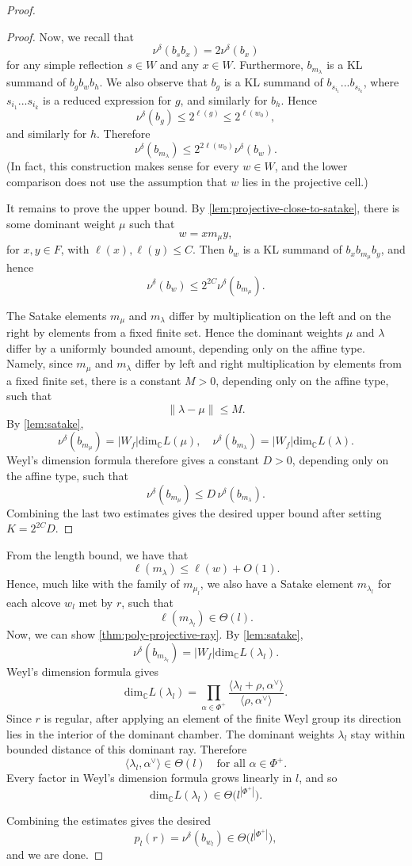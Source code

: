 \documentclass[a4paper,11pt]{amsart}
\renewcommand{\dots}{\text{...}}
\newcommand{\C}{\mathbb{C}}
\renewcommand{\dim}[1][\C]{\mathrm{dim}_{#1}}
\numberwithin{equation}{subsection}
\theoremstyle{definition}
\theoremstyle{remark}
\begin{document}
\begin{proof}
\begin{proof}
Now, we recall that
\[
\nu^\delta(b_sb_x)=2\nu^\delta(b_x)
\]
for any simple reflection \(s\in W\) and any \(x\in W\). Furthermore,
\(b_{m_\lambda}\) is a KL summand of \(b_gb_wb_h\). We also observe that
\(b_g\) is a KL summand of
\(b_{s_{i_1}}\dots b_{s_{i_k}}\), where
\(s_{i_1}\dots s_{i_k}\) is a reduced expression for \(g\), and similarly
for \(b_h\). Hence
\[
\nu^\delta(b_g)\leq 2^{\ell(g)}\leq 2^{\ell(w_0)},
\]
and similarly for \(h\). Therefore
\[
\nu^\delta(b_{m_\lambda})
\leq
2^{2\ell(w_0)}\nu^\delta(b_w).
\]
(In fact, this construction makes sense for every \(w\in W\), and the
lower comparison does not use the assumption that \(w\) lies in the
projective cell.)

It remains to prove the upper bound. By
\autoref{lem:projective-close-to-satake}, there is some dominant weight
\(\mu\) such that
\[
w=xm_\mu y,
\]
for \(x,y\in F\), with \(\ell(x),\ell(y)\leq C\). Then \(b_w\) is a KL summand
of \(b_xb_{m_\mu}b_y\), and hence
\[
\nu^\delta(b_w)
\leq
2^{2C}\nu^\delta(b_{m_\mu}).
\]

The Satake elements \(m_\mu\) and \(m_\lambda\) differ by multiplication on the
left and on the right by elements from a fixed finite set. Hence the dominant
weights \(\mu\) and \(\lambda\) differ by a uniformly bounded amount, depending
only on the affine type.
Namely, since \(m_\mu\) and \(m_\lambda\) differ by left and right multiplication by
elements from a fixed finite set, there is a constant \(M>0\), depending only
on the affine type, such that
\[
\|\lambda-\mu\|\leq M.
\]
By \autoref{lem:satake},
\[
\nu^\delta(b_{m_\mu})
=
|W_f|\dim L(\mu),
\quad
\nu^\delta(b_{m_\lambda})
=
|W_f|\dim L(\lambda).
\]
Weyl's dimension formula therefore gives a constant \(D>0\), depending only on
the affine type, such that
\[
\nu^\delta(b_{m_\mu})
\leq
D\,\nu^\delta(b_{m_\lambda}).
\]
Combining the last two estimates gives the desired upper bound after setting
\(K=2^{2C}D\).
\end{proof}

From the length bound, we have that
\[
\ell(m_\lambda)\leq \ell(w)+O(1).
\]
Hence, much like with the family of \(m_{\mu_l}\), we also have a Satake element
\(m_{\lambda_l}\) for each alcove \(w_l\) met by \(r\), such that
\[
\ell(m_{\lambda_l})\in \Theta(l).
\]
Now, we can show \autoref{thm:poly-projective-ray}.
By \autoref{lem:satake},
\[
\nu^\delta(b_{m_{\lambda_l}})
=
|W_f|\dim L(\lambda_l).
\]
Weyl's dimension formula gives
\[
\dim L(\lambda_l)
=
\prod_{\alpha\in \Phi^+}
\frac{\langle \lambda_l+\rho,\alpha^\vee\rangle}
{\langle \rho,\alpha^\vee\rangle}.
\]
Since \(r\) is regular, after applying an element of the finite Weyl group its
direction lies in the interior of the dominant chamber. The dominant weights
\(\lambda_l\) stay within bounded distance of this dominant ray. Therefore
\[
\langle \lambda_l,\alpha^\vee\rangle\in \Theta(l)
\quad
\text{for all }\alpha\in \Phi^+.
\]
Every factor in Weyl's dimension formula grows linearly in \(l\), and so
\[
\dim L(\lambda_l)\in \Theta\bigl(l^{|\Phi^+|}\bigr).
\]

Combining the estimates gives the desired
\[
p_l(r)=\nu^\delta(b_{w_l})
\in \Theta\bigl(l^{|\Phi^+|}\bigr),
\]
and we are done.
\end{proof}
\end{document}
